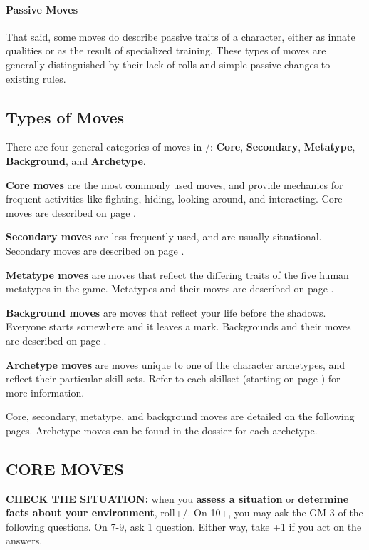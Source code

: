\documentclass[oneside,10pt]{article}
\begin{document}
\begin{multicols}{2}
\paragraph{Passive Moves}
That said, some moves do describe passive traits of a character,
either as innate qualities or as the result of specialized
training. These types of moves are generally distinguished by their
lack of rolls and simple passive changes to existing rules.

\subsection{Types of Moves}
There are four general categories of moves in
\SW/: \textbf{Core}, \textbf{Secondary}, \textbf{Metatype},
\textbf{Background}, and \textbf{Archetype}.

\begin{dent}
\textbf{Core moves} are the most commonly used moves, and
provide mechanics for frequent activities like
fighting, hiding, looking around, and interacting. Core moves are
described on page \pageref{coremoves}.

\textbf{Secondary moves} are less frequently used, and are usually
situational. Secondary moves are described on page \pageref{secondarymoves}.

\textbf{Metatype moves} are moves that reflect the differing traits
of the five human metatypes in the game. Metatypes and their  moves are described
on page \pageref{metatypes}.

\textbf{Background moves} are moves that reflect your life before the
shadows. Everyone starts somewhere and it leaves a mark. Backgrounds
and their moves are described on page \pageref{backgrounds}.

\textbf{Archetype moves} are moves unique to one
of the character archetypes, and reflect their particular skill
sets. Refer to each skillset (starting on page \pageref{skillsets})
for more information.

\end{dent}

Core, secondary, metatype, and background moves are detailed on the
following pages. Archetype moves can be found in the dossier for each archetype.

\subsection{CORE MOVES}
\label{coremoves}

\label{move_checkthesituation}
\textbf{CHECK THE SITUATION:} when you \textbf{assess a situation} or
\textbf{determine facts about your environment}, roll+\twitch/.
On 10+, you may ask the GM 3 of the following questions.
On 7-9, ask 1 question. Either way, take +1 if you act on the
answers.
\begin{dent}


\end{dent}
\end{multicols}
\end{document}
